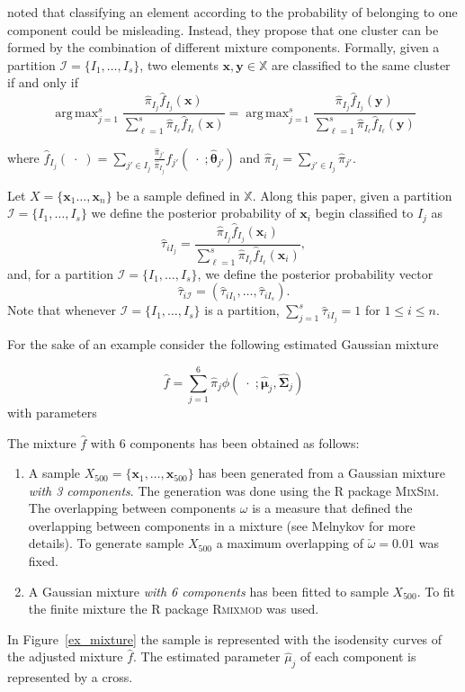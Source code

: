 \documentclass[10pt, a4paper]{article}
\DeclareMathOperator*{\argmax}{arg\,max}
\newcommand{\m}[1]{\boldsymbol{#1}}
\begin{document}
\cite{lee2004combining,hennig2010methods,baudry2010combining,melnykov2013distribution,pastore2013merging} noted that classifying an element according to the probability of belonging to one component could be misleading. Instead, they propose that one cluster can be formed by the combination of different mixture components. Formally, given a partition $\mathcal{I} = \{ I_1, \dots, I_s\}$, two elements $\m x, \m y \in \mathbb{X}$ are classified to the same cluster if and only if
\begin{equation}\label{cluster_criteria}
\argmax_{j=1}^s \frac{ \hat{\pi}_{I_j} \hat{f}_{I_j}(\m x) }{\sum_{\ell=1}^s \hat{\pi}_{I_\ell} \hat{f}_{I_\ell}(\m x ) } = \argmax_{j=1}^s \frac{ \hat{\pi}_{I_j} \hat{f}_{I_j}(\m y) }{ \sum_{\ell=1}^s \hat{\pi}_{I_\ell} \hat{f}_{I_\ell}(\m y) }
\end{equation}

where $\hat{f}_{I_j}(\; \cdot \;) = \sum_{j' \in I_j} \frac{\hat{\pi}_{j'}}{\hat{\pi}_{I_j}} f_{j'}(\; \cdot \; ; \hat{\m\theta}_{j'})$ and $\hat{\pi}_{I_j} =  \sum_{j' \in I_j} \hat{\pi}_{j'}$. 

Let $X = \{\m x_1\dots, \m x_n\}$ be a sample defined in $\mathbb{X}$. Along this paper, given a partition $\mathcal{I} = \{ I_1, \dots, I_s \}$ we define the posterior probability  of $\m x_i$ begin classified to $I_j$ as
\[
\hat{\tau}_{i I_j} =  \frac{ \hat{\pi}_{I_j} \hat{f}_{I_j}(\m x_i) }{\sum_{\ell=1}^s \hat{\pi}_{I_\ell} \hat{f}_{I_\ell}(\m x_i)},
\]
and, for a partition  $\mathcal{I} = \{ I_1, \dots, I_s\}$, we define the posterior probability vector
\[
\hat{\tau}_{i \mathcal{I}} = \left( \hat{\tau}_{i I_1} , \dots, \hat{\tau}_{i I_s}  \right).
\]
Note that whenever  $\mathcal{I} = \{ I_1, \dots, I_s\}$ is a partition, $\sum_{j=1}^s \hat{\tau}_{i I_j} = 1$ for $1 \leq i \leq n$.

For the sake of an example consider the following estimated Gaussian mixture

\[
\hat{f} = \sum_{j=1}^6 \hat{\pi}_j \phi(\;\cdot\; ; \hat{\m\mu}_j, \hat{\m\Sigma}_j)
\]
with parameters
{\small

}

The mixture $\hat{f}$ with $6$ components has been obtained as follows:
\begin{enumerate}
\item A sample  $X_{500}=\{\m x_1, \dots, \m x_{500}\}$ has been generated from a Gaussian mixture \emph{with 3 components}. The generation was done using the R package \textsc{MixSim}. The overlapping between components $\omega$ is a measure that defined the overlapping between components in a mixture (see Melnykov for more details). To generate sample $X_{500}$ a maximum overlapping of  $\check{\omega} = 0.01$ was fixed.
\item A Gaussian mixture \emph{with 6 components} has been fitted to sample $X_{500}$. To fit the finite mixture the R package \textsc{Rmixmod} was used.
\end{enumerate}
In Figure~\ref{ex_mixture} the sample is represented with the isodensity curves of the adjusted mixture $\hat{f}$. The estimated parameter $\hat{\mu}_j$ of each component is represented by a cross.
\end{document}
